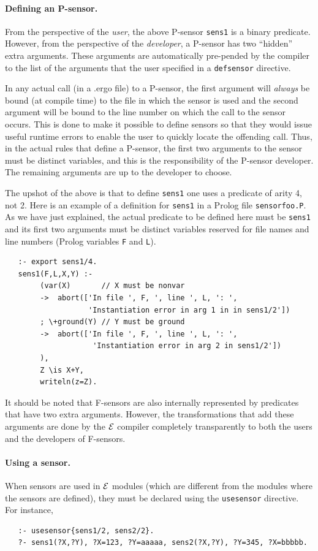 \documentclass[11pt]{article}
\newcommand{\ERGO}{\mbox{\ensuremath{\cal{E}}\smaller{{\sc{RGO}}}}\xspace}
\newcommand{\FLSYSTEM}{\ERGO}
\newcommand{\ergoext}{ergo\xspace}
\begin{document}
\paragraph{Defining an P-sensor.}
From the perspective of the \emph{user}, the above P-sensor
\texttt{sens1} is
a binary predicate. However, 
from the perspective of the \emph{developer}, a P-sensor has two
``hidden'' extra arguments. These arguments 
are automatically pre-pended by the compiler to the list of the arguments
that the user specified in a \texttt{defsensor} directive. 

In any actual call (in a .\ergoext file) to a P-sensor, the first argument will
\emph{always} be bound (at compile time) to the
file in which the sensor is used and the second 
argument will be bound to the line number
on which the call to the sensor occurs.
This is done to make it possible to define sensors so that they
would issue useful runtime errors to
enable the user to quickly locate the offending call. 
Thus, in the actual rules that define a P-sensor,
the first two arguments to the sensor must be distinct variables, and this
is the responsibility of the P-sensor developer.
The remaining arguments are up to the developer to choose.

The upshot of the above is that
to define \texttt{sens1} one uses
a predicate of arity 4, not 2.  
Here is an example of a definition for \texttt{sens1} in a Prolog file
\texttt{sensorfoo.P}. As we have just
explained, the actual predicate to be defined here must be \texttt{sens1}
and its first two arguments must be distinct variables 
reserved for file names and line numbers
(Prolog variables \texttt{F} and \texttt{L}).  
\begin{verbatim}
   :- export sens1/4.
   sens1(F,L,X,Y) :-
        (var(X)       // X must be nonvar
        ->  abort(['In file ', F, ', line ', L, ': ',
                   'Instantiation error in arg 1 in in sens1/2'])
        ; \+ground(Y) // Y must be ground
        ->  abort(['In file ', F, ', line ', L, ': ',
                    'Instantiation error in arg 2 in sens1/2'])
        ),
        Z \is X+Y,
        writeln(z=Z).
\end{verbatim}

It should be noted that F-sensors are also internally represented by
predicates that have two extra arguments. However, the transformations that
add these arguments are done by the \FLSYSTEM compiler completely
transparently to both the users and the developers of F-sensors.

\paragraph{Using a sensor.}
When sensors are
used in \FLSYSTEM modules (which are different from the modules where the
sensors are defined), they must be declared using the
\texttt{usesensor} directive.  For instance,
\begin{verbatim}
   :- usesensor{sens1/2, sens2/2}.
   ?- sens1(?X,?Y), ?X=123, ?Y=aaaaa, sens2(?X,?Y), ?Y=345, ?X=bbbbb.
\end{verbatim}
\end{document}
